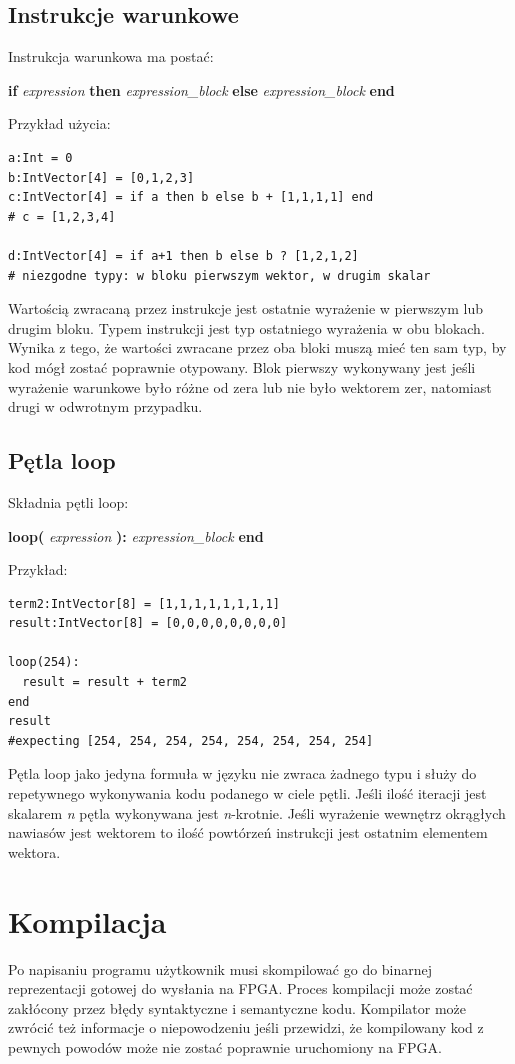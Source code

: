 \subsection{Instrukcje warunkowe}
Instrukcja warunkowa ma postać:
\begin{center}
\textbf{if} \textit{expression} \textbf{then} \textit{expression\_block} \textbf{else} \textit{expression\_block} \textbf{end}
\end{center}
Przykład użycia:\\
\begin{lstlisting}[frame=single]
a:Int = 0
b:IntVector[4] = [0,1,2,3]
c:IntVector[4] = if a then b else b + [1,1,1,1] end
# c = [1,2,3,4]

d:IntVector[4] = if a+1 then b else b ? [1,2,1,2]
# niezgodne typy: w bloku pierwszym wektor, w drugim skalar 
\end{lstlisting}
Wartością zwracaną przez instrukcje jest ostatnie wyrażenie w pierwszym lub drugim bloku. Typem instrukcji jest typ ostatniego wyrażenia w obu blokach. Wynika z tego, że wartości zwracane przez oba bloki muszą mieć ten sam typ, by kod mógł zostać poprawnie otypowany. Blok pierwszy wykonywany jest jeśli wyrażenie warunkowe było różne od zera lub nie było wektorem zer, natomiast drugi w odwrotnym przypadku.
\subsection{Pętla loop}
Składnia pętli loop:
\begin{center}
\textbf{loop(} \textit{expression} \textbf{):} \textit{expression\_block} \textbf{end}
\end{center}
Przykład:\\
\begin{lstlisting}[frame=single]
term2:IntVector[8] = [1,1,1,1,1,1,1,1]
result:IntVector[8] = [0,0,0,0,0,0,0,0]

loop(254):
  result = result + term2
end
result
#expecting [254, 254, 254, 254, 254, 254, 254, 254] 
\end{lstlisting}
Pętla loop jako jedyna formuła w języku nie zwraca żadnego typu i służy do repetywnego wykonywania kodu podanego w ciele pętli. Jeśli ilość iteracji jest skalarem \textit{n} pętla wykonywana jest \textit{n}-krotnie. Jeśli wyrażenie wewnętrz okrągłych nawiasów jest wektorem to ilość powtórzeń instrukcji jest ostatnim elementem wektora.
\section{Kompilacja}
Po napisaniu programu użytkownik musi skompilować go do binarnej reprezentacji gotowej do wysłania na FPGA. Proces kompilacji może zostać zakłócony przez błędy syntaktyczne i semantyczne kodu. Kompilator może zwrócić też informacje o niepowodzeniu jeśli przewidzi, że kompilowany kod z pewnych powodów może nie zostać poprawnie uruchomiony na FPGA.
